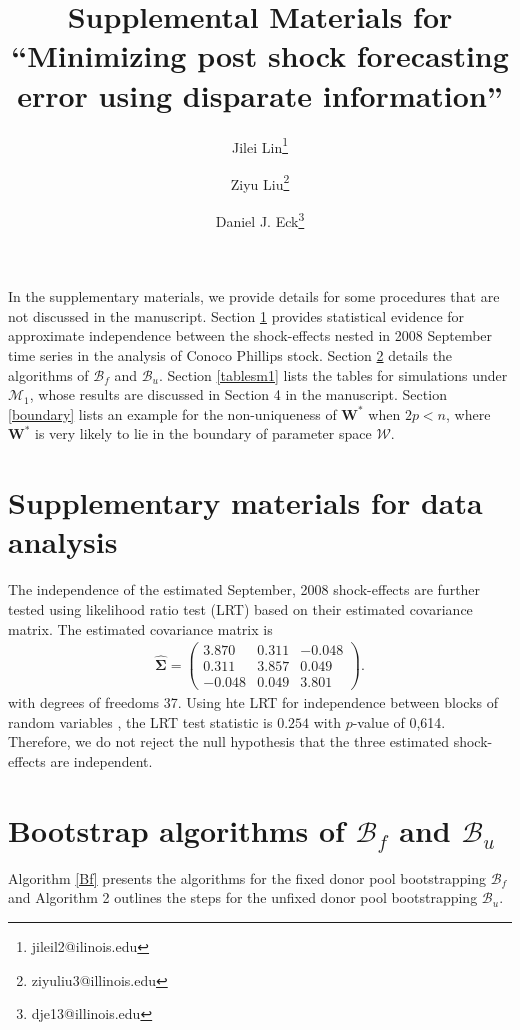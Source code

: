 \documentclass[11pt]{article}
\title{Supplemental Materials for ``Minimizing post shock forecasting error using disparate information''}
\author{Jilei Lin\thanks{jileil2@ilinois.edu}}
\author{Ziyu Liu\thanks{ziyuliu3@illinois.edu}}
\author{Daniel J. Eck\thanks{dje13@illinois.edu}}
\affil{Department of Statistics, University of Illinois at Urbana-Champaign}
\def\mbf#1{\mathbf{#1}} %
\def\mc#1{\mathcal{#1}} %
\theoremstyle{definition}
\begin{document}
\maketitle

In the supplementary materials, we provide details for some procedures that are not discussed in the manuscript. Section \ref{smfda} provides statistical evidence for approximate independence between  the shock-effects nested in 2008 September time series in the analysis of Conoco Phillips stock. Section \ref{bf} details the algorithms of $\mc{B}_f$ and $\mc{B}_u$. Section  \ref{tablesm1} lists the tables for simulations under $\mc{M}_1$, whose results are discussed in Section 4 in the manuscript. Section \ref{boundary} lists an example for the non-uniqueness of $\mbf{W}^*$ when $2p < n$, where $\mbf{W}^*$ is very likely to lie in the boundary of parameter space $\mc{W}$.


\section{Supplementary materials for data analysis}
\label{smfda}
The independence of the estimated September, 2008 shock-effects are further tested using likelihood ratio test (LRT) based on their estimated covariance matrix. The estimated covariance matrix is
\begin{align*}
  \hat{\mathbf{\Sigma}}=\left(\begin{array}{rrr}
    3.870 & 0.311 & -0.048 \\
    0.311 & 3.857 & 0.049 \\
    -0.048 & 0.049 & 3.801
  \end{array}\right).
\end{align*}
with degrees of freedoms 37. Using hte LRT for independence between blocks of random variables \citep[Section 10.2]{msos}, the LRT test statistic is $0.254$ with $p$-value of 0,614. Therefore, we do not reject  the null hypothesis that the three estimated shock-effects are independent. 

\section{Bootstrap algorithms of  $\mc{B}_f$ and $\mc{B}_u$}
\label{bf}

Algorithm \ref{Bf} presents the algorithms for the fixed donor pool bootstrapping  $\mc{B}_f$ and Algorithm 2 outlines the steps for the unfixed donor pool bootstrapping $\mc{B}_u$.
\end{document}
